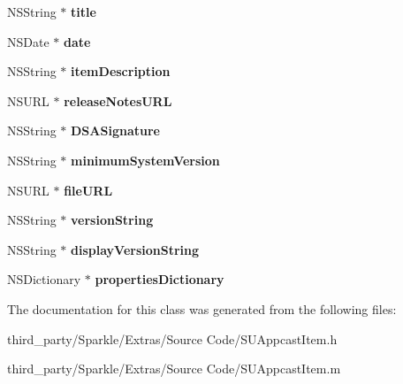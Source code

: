 \begin{DoxyCompactItemize}
\item 
\mbox{\label{interface_s_u_appcast_item_ae3176961059d3f21ea060e5c83b62f1b}} 
N\+S\+String $\ast$ {\bfseries title}
\item 
\mbox{\label{interface_s_u_appcast_item_af1ef64056a5ddad487eeba6d34385a52}} 
N\+S\+Date $\ast$ {\bfseries date}
\item 
\mbox{\label{interface_s_u_appcast_item_a14d9b9161f51765a952b3ec8d4187b23}} 
N\+S\+String $\ast$ {\bfseries item\+Description}
\item 
\mbox{\label{interface_s_u_appcast_item_a21339ef4ce45e3be96e12127d9db3f5c}} 
N\+S\+U\+RL $\ast$ {\bfseries release\+Notes\+U\+RL}
\item 
\mbox{\label{interface_s_u_appcast_item_ae8626d31ea5f3e789dc60471cdea2b3d}} 
N\+S\+String $\ast$ {\bfseries D\+S\+A\+Signature}
\item 
\mbox{\label{interface_s_u_appcast_item_aa47e67cc9f13583372db418af056a280}} 
N\+S\+String $\ast$ {\bfseries minimum\+System\+Version}
\item 
\mbox{\label{interface_s_u_appcast_item_a0ff161bc1f1669f67b7eb5ac98ccfb95}} 
N\+S\+U\+RL $\ast$ {\bfseries file\+U\+RL}
\item 
\mbox{\label{interface_s_u_appcast_item_aa84f2ffd7814c9f9114026399e806706}} 
N\+S\+String $\ast$ {\bfseries version\+String}
\item 
\mbox{\label{interface_s_u_appcast_item_a307f46c104c0acf065e110285653f7d1}} 
N\+S\+String $\ast$ {\bfseries display\+Version\+String}
\item 
\mbox{\label{interface_s_u_appcast_item_ae67e41e25982d0ee0886201a90d5c9fc}} 
N\+S\+Dictionary $\ast$ {\bfseries properties\+Dictionary}
\end{DoxyCompactItemize}


The documentation for this class was generated from the following files\+:\begin{DoxyCompactItemize}
\item 
third\+\_\+party/\+Sparkle/\+Extras/\+Source Code/S\+U\+Appcast\+Item.\+h\item 
third\+\_\+party/\+Sparkle/\+Extras/\+Source Code/S\+U\+Appcast\+Item.\+m\end{DoxyCompactItemize}
